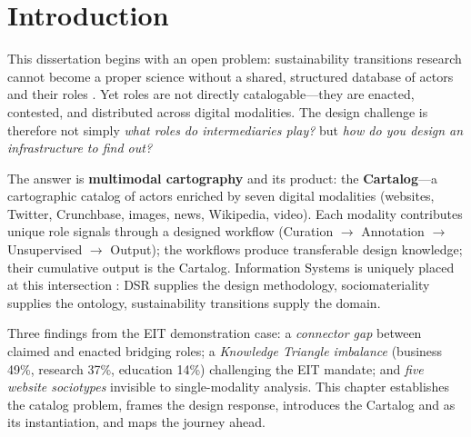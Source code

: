 \documentclass[../main.tex]{subfiles}
\begin{document}
\chapter{Introduction}
\margintoc


\begin{chapteroverview}
This dissertation begins with an open problem: sustainability transitions research cannot become a proper science without a shared, structured database of actors and their roles \parencite{dehaan2025makingscience}. Yet roles are not directly catalogable---they are enacted, contested, and distributed across digital modalities. The design challenge is therefore not simply \emph{what roles do intermediaries play?} but \emph{how do you design an infrastructure to find out?}

The answer is \textbf{multimodal cartography} and its product: the \textbf{Cartalog}---a cartographic catalog of actors enriched by seven digital modalities (websites, Twitter, Crunchbase, images, news, Wikipedia, video). Each modality contributes unique role signals through a designed workflow (Curation $\rightarrow$ Annotation $\rightarrow$ Unsupervised $\rightarrow$ Output); the workflows produce transferable design knowledge; their cumulative output is the Cartalog. Information Systems is uniquely placed at this intersection \parencite{maass2018data}: DSR supplies the design methodology, sociomateriality \parencite{Orlikowski2007} supplies the ontology, sustainability transitions supply the domain.

Three findings from the EIT demonstration case: a \emph{connector gap} between claimed and enacted bridging roles; a \emph{Knowledge Triangle imbalance} (business 49\%, research 37\%, education 14\%) challenging the EIT mandate; and \emph{five website sociotypes} invisible to single-modality analysis. This chapter establishes the catalog problem, frames the design response, introduces the Cartalog and \RoleBox{} as its instantiation, and maps the journey ahead.
\end{chapteroverview}
\end{document}
